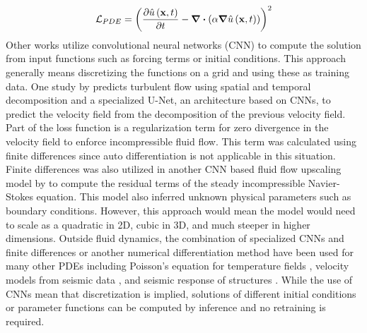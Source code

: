 \begin{equation}\label{eq:heat_pinn_loss}
    \mathcal{L}_{PDE}={\left(\pdv{\hat{u}\left(\vb{x},t\right)}{t}-\divergence{\left(\alpha \gradient \hat{u}\left(\vb{x},t\right)\right)}\right)}^2
\end{equation}
Other works utilize convolutional neural networks (CNN) to compute the solution from input functions such as forcing terms or initial conditions. This approach generally means discretizing the functions on a grid and using these as training data. One study by \textcite{wangPhysicsinformedDeepLearning2020} predicts turbulent flow using spatial and temporal decomposition and a specialized U-Net, an architecture based on CNNs, to predict the velocity field from the decomposition of the previous velocity field. Part of the loss function is a regularization term for zero divergence in the velocity field to enforce incompressible fluid flow. This term was calculated using finite differences since auto differentiation is not applicable in this situation. Finite differences was also utilized in another CNN based fluid flow upscaling model by \textcite{gaoSuperresolutionDenoisingFluid2021} to compute the residual terms of the steady incompressible Navier-Stokes equation. This model also inferred unknown physical parameters such as boundary conditions. However, this approach would mean the model would need to scale as a quadratic in 2D, cubic in 3D, and much steeper in higher dimensions. Outside fluid dynamics, the combination of specialized CNNs and finite differences or another numerical differentiation method have been used for many other PDEs including Poisson's equation for temperature fields \autocite{zhaoPhysicsinformedConvolutionalNeural2023, gaoPhyGeoNetPhysicsinformedGeometryadaptive2021}, velocity models from seismic data \autocite{mullerDeepPretrainedFWI2023}, and seismic response of structures \autocite{zhangPhysicsguidedConvolutionalNeural2020,niMultiEndPhysicsInformedDeep2022}. While the use of CNNs mean that discretization is implied, solutions of different initial conditions or parameter functions can be computed by inference and no retraining is required.

